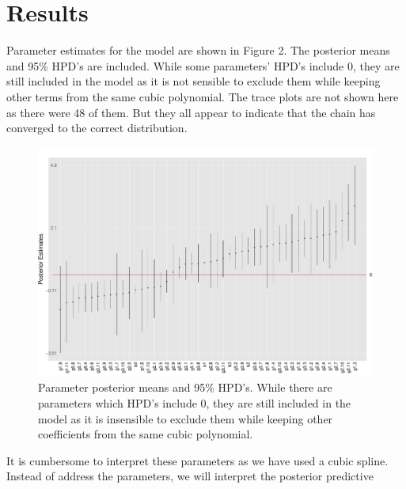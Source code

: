 \documentclass[mathserif]{article}
\def\beginmyfig{\begin{figure}[htbp]\begin{center}}
\def\endmyfig{\end{center}\end{figure}}
\begin{document}

\section*{Results}
Parameter estimates for the model are shown in Figure 2. The posterior means and
95\% HPD's are included. While some parameters' HPD's include 0, they are still
included in the model as it is not sensible to exclude them while keeping other
terms from the same cubic polynomial. The trace plots are not shown here as
there were 48 of them. But they all appear to indicate that the chain has
converged to the correct distribution.
\beginmyfig
  \includegraphics[scale=.35]{../../images/hpd.pdf}
  \caption{Parameter posterior means and 95\% HPD's. While there
           are parameters which HPD's include 0, they are still
           included in the model as it is insensible to
           exclude them while keeping other coefficients from
           the same cubic polynomial.}
\endmyfig  
It is cumbersome to interpret these parameters as we have used a cubic spline.
Instead of address the parameters, we will interpret the posterior predictive
\end{document}

